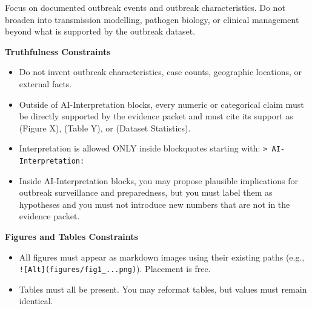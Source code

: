 \begin{tcolorbox}
\begin{tcolorbox}[
    enhanced,
    colback=gray!5,
    colframe=gray!20,
    boxrule=0pt,
    leftrule=3pt,
    arc=0pt,
    left=6pt, right=6pt, top=4pt, bottom=4pt
]
\vspace{2pt}
{\small
Focus on documented outbreak events and outbreak characteristics. Do not broaden into transmission modelling, pathogen biology, or clinical management beyond what is supported by the outbreak dataset.
}
\end{tcolorbox}

\begin{tcolorbox}[
    enhanced,
    colback=gray!5,
    colframe=gray!20,
    boxrule=0pt,
    leftrule=3pt,
    arc=0pt,
    left=6pt, right=6pt, top=4pt, bottom=4pt
]
{\small\textbf{\textcolor{gray!60!black}{Truthfulness Constraints}}}

\vspace{2pt}
{\small
\begin{itemize}[leftmargin=*, itemsep=-3pt]
    \item Do not invent outbreak characteristics, case counts, geographic locations, or external facts.
    \item Outside of AI-Interpretation blocks, every numeric or categorical claim must be directly supported by the evidence packet and must cite its support as (Figure X), (Table Y), or (Dataset Statistics).
    \item Interpretation is allowed ONLY inside blockquotes starting with: \texttt{> AI-Interpretation:}
    \item Inside AI-Interpretation blocks, you may propose plausible implications for outbreak surveillance and preparedness, but you must label them as hypotheses and you must not introduce new numbers that are not in the evidence packet.
\end{itemize}
}
\end{tcolorbox}

\begin{tcolorbox}[
    enhanced,
    colback=gray!5,
    colframe=gray!20,
    boxrule=0pt,
    leftrule=3pt,
    arc=0pt,
    left=6pt, right=6pt, top=4pt, bottom=4pt
]
{\small\textbf{\textcolor{gray!60!black}{Figures and Tables Constraints}}}

\vspace{2pt}
{\small
\begin{itemize}[leftmargin=*, itemsep=-3pt]
    \item All figures must appear as markdown images using their existing paths (e.g., \texttt{![Alt](figures/fig1\_...png)}). Placement is free.
    \item Tables must all be present. You may reformat tables, but values must remain identical.
\end{itemize}
}
\end{tcolorbox}


\end{tcolorbox}
